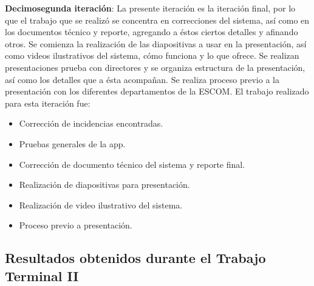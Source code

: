 \noindent
\newline
\textbf{Decimosegunda iteración}: La presente iteración es la iteración final, por lo que el trabajo que se realizó se concentra en correcciones del sistema, así como en los documentos técnico y reporte, agregando a éstos ciertos detalles y afinando otros. Se comienza la realización de las diapositivas a usar en la presentación, así como videos ilustrativos del sistema, cómo funciona y lo que ofrece. Se realizan presentaciones prueba con directores y se organiza estructura de la presentación, así como los detalles que a ésta acompañan.
Se realiza proceso previo a la presentación con los diferentes departamentos de la ESCOM. 
\newline
El trabajo realizado para esta iteración fue:
\begin{itemize}
	\item Corrección de incidencias encontradas.
	\item Pruebas generales de la app. 
	\item Corrección de documento técnico del sistema y reporte final.
	\item Realización de diapositivas para presentación.
	\item Realización de video ilustrativo del sistema.
	\item Proceso previo a presentación.
\end{itemize}




\subsection{Resultados obtenidos durante el Trabajo Terminal II}

